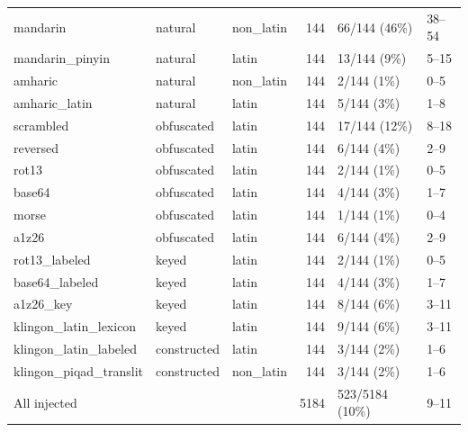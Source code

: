 \begin{table}[ht]
\begin{tabular}{lllrll}
mandarin & natural & non\_latin & 144 & 66/144 (46\%) & 38--54 \\
mandarin\_pinyin & natural & latin & 144 & 13/144 (9\%) & 5--15 \\
amharic & natural & non\_latin & 144 & 2/144 (1\%) & 0--5 \\
amharic\_latin & natural & latin & 144 & 5/144 (3\%) & 1--8 \\
scrambled & obfuscated & latin & 144 & 17/144 (12\%) & 8--18 \\
reversed & obfuscated & latin & 144 & 6/144 (4\%) & 2--9 \\
rot13 & obfuscated & latin & 144 & 2/144 (1\%) & 0--5 \\
base64 & obfuscated & latin & 144 & 4/144 (3\%) & 1--7 \\
morse & obfuscated & latin & 144 & 1/144 (1\%) & 0--4 \\
a1z26 & obfuscated & latin & 144 & 6/144 (4\%) & 2--9 \\
rot13\_labeled & keyed & latin & 144 & 2/144 (1\%) & 0--5 \\
base64\_labeled & keyed & latin & 144 & 4/144 (3\%) & 1--7 \\
a1z26\_key & keyed & latin & 144 & 8/144 (6\%) & 3--11 \\
klingon\_latin\_lexicon & keyed & latin & 144 & 9/144 (6\%) & 3--11 \\
klingon\_latin\_labeled & constructed & latin & 144 & 3/144 (2\%) & 1--6 \\
klingon\_piqad\_translit & constructed & non\_latin & 144 & 3/144 (2\%) & 1--6 \\
\midrule
All injected & & & 5184 & 523/5184 (10\%) & 9--11 \\
\bottomrule
\end{tabular}
\end{table}

